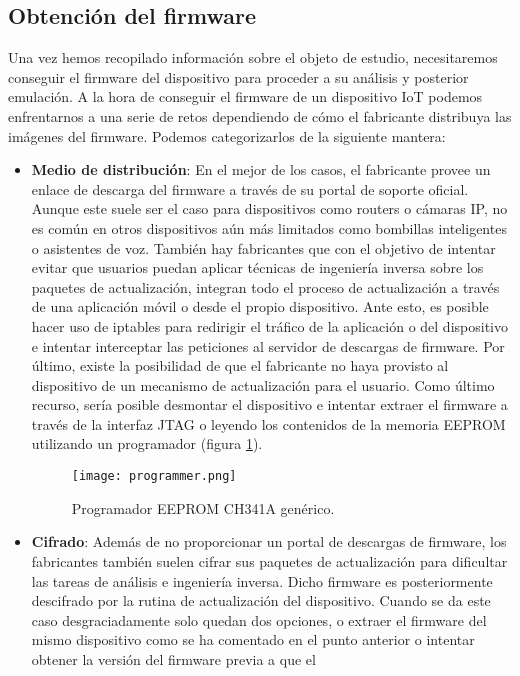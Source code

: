 \subsection{Obtención del firmware}
Una vez hemos recopilado información sobre el objeto de estudio, necesitaremos conseguir el firmware del dispositivo para proceder a su análisis y posterior 
emulación. A la hora de conseguir el firmware de un dispositivo IoT podemos enfrentarnos a una serie de retos dependiendo de cómo el fabricante distribuya
las imágenes del firmware. Podemos categorizarlos de la siguiente mantera:
\begin{itemize}
    \item \textbf{Medio de distribución}: En el mejor de los casos, el fabricante provee un enlace de descarga del firmware a través de su portal de soporte oficial. Aunque
    este suele ser el caso para dispositivos como routers o cámaras IP, no es común en otros dispositivos aún más limitados como bombillas inteligentes o asistentes de voz.
    También hay fabricantes que con el objetivo de intentar evitar que usuarios puedan aplicar técnicas de ingeniería inversa sobre los paquetes de actualización, integran 
    todo el proceso de actualización a través de una aplicación móvil o desde el propio dispositivo. Ante esto, es posible hacer uso de iptables para redirigir el tráfico
    de la aplicación o del dispositivo e intentar interceptar las peticiones al servidor de descargas de firmware. Por último, existe la posibilidad de que el fabricante no 
    haya provisto al dispositivo de un mecanismo de actualización para el usuario. Como último recurso, sería posible desmontar el dispositivo e intentar extraer el firmware 
    a través de la interfaz JTAG o leyendo los contenidos de la memoria EEPROM utilizando un programador (figura \ref{fig:programador}).
    \begin{figure}[H]
        \centering
        \texttt{[image: programmer.png]}
        \caption{Programador EEPROM CH341A genérico.}
        \label{fig:programador}
    \end{figure}
    \item \textbf{Cifrado}: Además de no proporcionar un portal de descargas de firmware, los fabricantes también suelen cifrar sus paquetes de actualización para dificultar las 
    tareas de análisis e ingeniería inversa. Dicho firmware es posteriormente descifrado por la rutina de actualización del dispositivo. Cuando se da este caso desgraciadamente 
    solo quedan dos opciones, o extraer el firmware del mismo dispositivo como se ha comentado en el punto anterior o intentar obtener la versión del firmware previa a que el 

\end{itemize}

